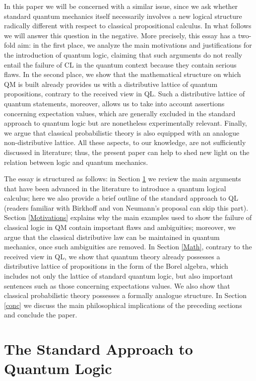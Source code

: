 \documentclass[11pt, executivepaper]{article}
\begin{document}
In this paper we will be concerned with a similar issue, since we ask whether standard quantum mechanics itself necessarily involves a new logical structure radically different with respect to classical propositional calculus. In what follows we will answer this question in the negative. More precisely, this essay has a two-fold aim: in the first place, we analyze the main motivations and justifications for the introduction of quantum logic, claiming that such arguments do not really entail the failure of CL in the quantum context because they contain serious flaws. In the second place, we show that the mathematical structure on which QM is built already provides us with a distributive lattice of quantum propositions, contrary to the received view in QL. Such a distributive lattice of quantum statements, moreover, allows us to take into account assertions concerning expectation values, which are generally excluded in the standard approach to quantum logic but are nonetheless experimentally relevant. Finally, we argue that classical probabilistic theory is also equipped with an analogue non-distributive lattice. All these aspects, to our knowledge, are not sufficiently discussed in literature; thus, the present paper can help to shed new light on the relation between logic and quantum mechanics.
\vspace{2mm}

The essay is structured as follows: in Section \ref{QL} we review the main arguments that have been advanced in the literature to introduce a quantum logical calculus; here we also provide a brief outline of the standard approach to QL (readers familiar with Birkhoff and von Neumann's proposal can skip this part). Section \ref{Motivations} explains why the main examples used to show the failure of classical logic in QM contain important flaws and ambiguities; moreover, we argue that the classical distributive law can be maintained in quantum mechanics, once such ambiguities are removed. In Section \ref{Math}, contrary to the received view in QL, we show that quantum theory already possesses a distributive lattice of propositions in the form of the Borel algebra, which includes not only the lattice of standard quantum logic, but also important sentences such as those concerning expectations values. We also show that classical probabilistic theory possesses a formally analogue structure. In Section \ref{conc} we discuss the main philosophical implications of the preceding sections and conclude the paper.

\section{The Standard Approach to Quantum Logic}
\label{QL}
\end{document}
